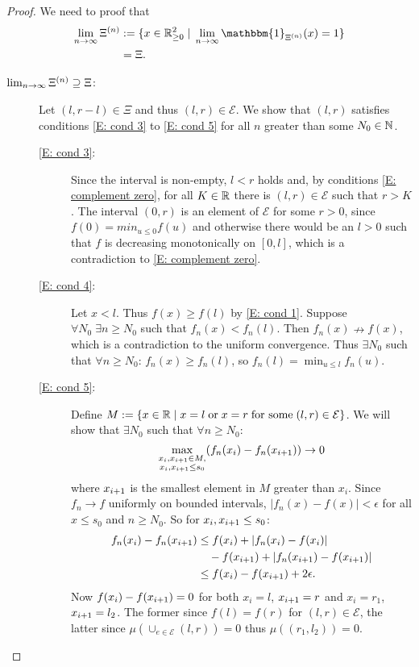 \begin{proof}
We need to proof that
\begin{equation}
\begin{aligned}
\lim_{n \rightarrow \infty} \Xin 
&:= \lbrace x \in \Real_{\geq 0}^2 \; | \; \lim_{n \rightarrow \infty} \mathbbm{1}_{\Xin}(x) = 1 \rbrace \\ 
&= \Xi.
\end{aligned}
\end{equation}
\begin{description} %
\item[$\lim_{n \rightarrow \infty} \Xi^{(n)} \supseteq \Xi$:] 
Let $(l, r-l) \in \Xi$ and thus $(l, r) \in \mathcal{E}$.
We show that $(l,r)$ satisfies conditions \eqref{E: cond 3} to \eqref{E: cond 5} for all $n$ greater than some $N_0 \in \mathbb{N}$.

\begin{description} %
	\item[\eqref{E: cond 3}:] 
Since the interval is non-empty, $l < r$ holds
and, by conditions \eqref{E: complement zero},
for all $K \in \mathbb{R}$ there is $(l,r) \in \mathcal{E}$ such that $r > K$.
The interval $(0,r)$ is an element of $\mathcal{E}$ for some $r>0$, 
since $f(0) = min_{u \leq 0}f(u)$
and otherwise there would be an $l>0$ such that $f$ is decreasing monotonically on $[0,l]$,
which is a contradiction to \eqref{E: complement zero}.
	\item[\eqref{E: cond 4}:]
Let $x < l$. Thus $f(x) \geq f(l)$ by \ref{E: cond 1}. 
Suppose $\forall N_0 \; \exists n \geq N_0$ such that
$f_n(x) < f_n(l)$.
Then $f_n(x) \nrightarrow f(x)$, 
which is a contradiction to the uniform convergence.
Thus $\exists N_0$ such that $\forall n \geq N_0$: 
$f_n(x) \geq f_n(l)$, so
$f_n(l) = \min_{u \leq l}f_n(u)$.
	\item[\eqref{E: cond 5}:]
Define $M:=\lbrace x \in \mathbb{R} \; | \; x=l \; \text{or} \; x=r \; \text{for some} \; (l,r) \in \mathcal{E} \rbrace$.
We will show that $\exists N_0$ such that $\forall n \geq N_0$:
\begin{equation*}
\max_{\substack{x_i, x_{i+1} \in M, \\ x_i, x_{i+1} \leq s_0}} (f_n(x_i) - f_n(x_{i+1})) \rightarrow 0
\end{equation*}
where $x_{i+1}$ is the smallest element in $M$ greater than $x_i$.
Since $f_n \rightarrow f$ uniformly on bounded intervals, 
$|f_n(x) - f(x)| < \epsilon$ for all $x \leq s_0$ and $n \geq N_0$.
So for $x_i, x_{i+1} \leq s_0$:
\begin{equation}
\begin{aligned}
f_n(x_i) - f_n(x_{i+1}) 
&\leq f(x_i) + |f_n(x_i) - f(x_i)| \\
&\quad - f(x_{i+1}) + |f_n(x_{i+1}) -f(x_{i+1})| \\
&\leq f(x_i) - f(x_{i+1}) + 2\epsilon.
\end{aligned} 
\end{equation}
Now $f(x_i) - f(x_{i+1}) = 0$ for both $x_i = l$, $x_{i+1} = r$ 
and $x_i = r_1$, $x_{i+1} = l_2$. 
The former since $f(l) = f(r)$ for $(l,r) \in \mathcal{E}$,
the latter since $\mu \left(\cup_{e \in \mathcal{E}} (l,r)\right) = 0$
thus $\mu \left( (r_1, l_2) \right) = 0$.


\end{description}
\end{description}
\end{proof}
